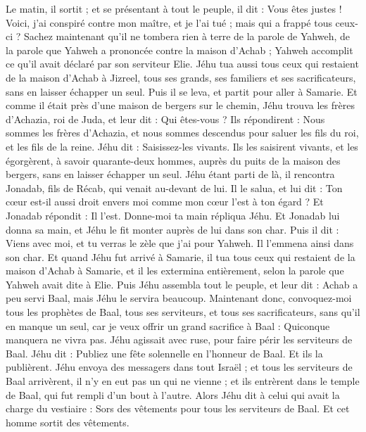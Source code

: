\begin{multicols}{2}
Le matin, il sortit ; et se présentant à tout le peuple, il dit : Vous êtes justes ! Voici, j’ai conspiré contre mon maître, et je l’ai tué ; mais qui a frappé tous ceux-ci ?
Sachez maintenant qu’il ne tombera rien à terre de la parole de Yahweh, de la parole que Yahweh a prononcée contre la maison d’Achab ; Yahweh accomplit ce qu’il avait déclaré par son serviteur Elie.
Jéhu tua aussi tous ceux qui restaient de la maison d’Achab à Jizreel, tous ses grands, ses familiers et ses sacrificateurs, sans en laisser échapper un seul.
Puis il se leva, et partit pour aller à Samarie. Et comme il était près d’une maison de bergers sur le chemin,
Jéhu trouva les frères d’Achazia, roi de Juda, et leur dit : Qui êtes-vous ? Ils répondirent : Nous sommes les frères d’Achazia, et nous sommes descendus pour saluer les fils du roi, et les fils de la reine.
Jéhu dit : Saisissez-les vivants. Ils les saisirent vivants, et les égorgèrent, à savoir quarante-deux hommes, auprès du puits de la maison des bergers, sans en laisser échapper un seul.
Jéhu étant parti de là, il rencontra Jonadab, fils de Récab, qui venait au-devant de lui. Il le salua, et lui dit : Ton cœur est-il aussi droit envers moi comme mon cœur l’est à ton égard ? Et Jonadab répondit : Il l’est. Donne-moi ta main répliqua Jéhu. Et Jonadab lui donna sa main, et Jéhu le fit monter auprès de lui dans son char.
Puis il dit : Viens avec moi, et tu verras le zèle que j’ai pour Yahweh. Il l’emmena ainsi dans son char.
Et quand Jéhu fut arrivé à Samarie, il tua tous ceux qui restaient de la maison d’Achab à Samarie, et il les extermina entièrement, selon la parole que Yahweh avait dite à Elie.
Puis Jéhu assembla tout le peuple, et leur dit : Achab a peu servi Baal, mais Jéhu le servira beaucoup.
Maintenant donc, convoquez-moi tous les prophètes de Baal, tous ses serviteurs, et tous ses sacrificateurs, sans qu’il en manque un seul, car je veux offrir un grand sacrifice à Baal : Quiconque manquera ne vivra pas. Jéhu agissait avec ruse, pour faire périr les serviteurs de Baal.
Jéhu dit : Publiez une fête solennelle en l’honneur de Baal. Et ils la publièrent.
Jéhu envoya des messagers dans tout Israël ; et tous les serviteurs de Baal arrivèrent, il n’y en eut pas un qui ne vienne ; et ils entrèrent dans le temple de Baal, qui fut rempli d’un bout à l’autre.
Alors Jéhu dit à celui qui avait la charge du vestiaire : Sors des vêtements pour tous les serviteurs de Baal. Et cet homme sortit des vêtements.

\end{multicols}
